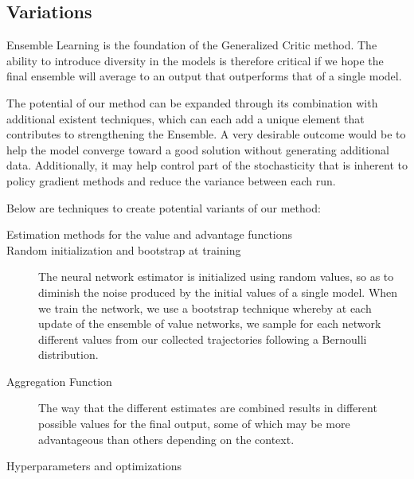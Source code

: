 



\subsection{Variations}

Ensemble Learning is the foundation of the Generalized Critic method. The ability to introduce diversity in the models is therefore critical if we hope the final ensemble will average to an output that outperforms that of a single model. 

The potential of our method can be expanded through its combination with additional existent techniques, which can each add a unique element that contributes to strengthening the Ensemble. A very desirable outcome would be to help the model converge toward a good solution without generating additional data. Additionally, it may help control part of the stochasticity that is inherent to policy gradient methods and reduce the variance between each run.

Below are techniques to create potential variants of our method:

\begin{description}
\item[Estimation methods for the value and advantage functions]






\item[Random initialization and bootstrap at training]

The neural network estimator is initialized using random values, so as to diminish the noise produced by the initial values of a single model. When we train the network, we use a bootstrap\cite{efron1982jackknife} technique whereby at each update of the ensemble of value networks, we sample for each network different values from our collected trajectories following a Bernoulli distribution.

\item[Aggregation Function] The way that the different estimates are combined results in different possible values for the final output, some of which may be more advantageous than others depending on the context.


\item[Hyperparameters and optimizations]

\end{description}


